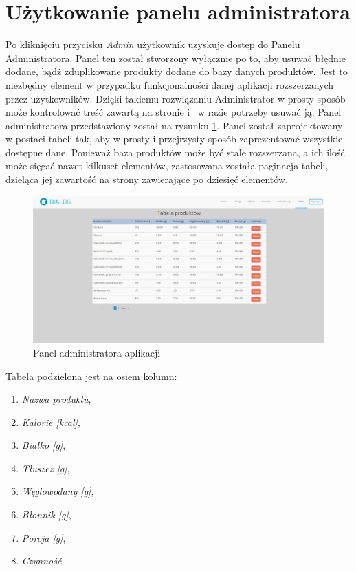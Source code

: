 \section{Użytkowanie panelu administratora}
Po kliknięciu przycisku \textit{Admin} użytkownik uzyskuje dostęp do Panelu Administratora. Panel ten został stworzony wyłącznie po to, aby usuwać błędnie dodane, bądź zduplikowane produkty dodane do bazy danych produktów. Jest to niezbędny element w przypadku funkcjonalności danej aplikacji rozszerzanych przez użytkowników. Dzięki takiemu rozwiązaniu Administrator w prosty sposób może kontrolować treść zawartą na stronie i~ w razie potrzeby usuwać ją. Panel administratora przedstawiony został na rysunku   \ref{Rys:panel_admin}. Panel został zaprojektowany w postaci tabeli tak, aby w prosty i przejrzysty sposób zaprezentować wszystkie dostępne dane. Ponieważ baza produktów może być stale rozszerzana, a ich ilość może sięgać nawet kilkuset elementów, zastosowana została paginacja tabeli, dzieląca jej zawartość na strony zawierające po dziesięć elementów.


\begin{figure}[h]
	\centering\includegraphics[scale=0.3]{images/panel_admin.jpg}
	\caption{Panel administratora aplikacji}
	\label{Rys:panel_admin}
\end{figure}

Tabela podzielona jest na osiem kolumn:
\begin{enumerate}
	\item \textit{Nazwa produktu},
	\item \textit{Kalorie [kcal]},
	\item \textit{Białko [g]},
	\item \textit{Tłuszcz [g]},
	\item \textit{Węglowodany [g]},
	\item \textit{Błonnik [g]},
	\item \textit{Porcja [g]},
	\item \textit{Czynność}.
\end{enumerate}

